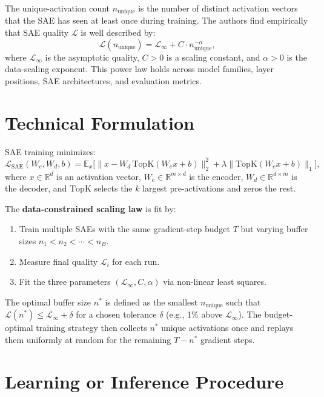 \documentclass[10pt,twocolumn]{article}
\begin{document}
The unique-activation count $n_\text{unique}$ is the number of distinct
activation vectors that the SAE has seen at least once during training. The
authors find empirically that SAE quality $\mathcal{L}$ is well described by:
\[
  \mathcal{L}(n_\text{unique}) = \mathcal{L}_\infty + C \cdot n_\text{unique}^{-\alpha},
\]
where $\mathcal{L}_\infty$ is the asymptotic quality, $C > 0$ is a scaling
constant, and $\alpha > 0$ is the data-scaling exponent. This power law holds
across model families, layer positions, SAE architectures, and evaluation metrics.

\section{Technical Formulation}

SAE training minimizes:
\[
  \mathcal{L}_\text{SAE}(W_e, W_d, b) =
    \mathbb{E}_x \bigl[ \|x - W_d\,\text{TopK}(W_e x + b)\|_2^2
    + \lambda \|\text{TopK}(W_e x + b)\|_1 \bigr],
\]
where $x \in \mathbb{R}^d$ is an activation vector, $W_e \in \mathbb{R}^{m\times d}$
is the encoder, $W_d \in \mathbb{R}^{d\times m}$ is the decoder, and
$\text{TopK}$ selects the $k$ largest pre-activations and zeros the rest.

The \textbf{data-constrained scaling law} is fit by:
\begin{enumerate}[itemsep=2pt,parsep=0pt]
  \item Train multiple SAEs with the same gradient-step budget $T$ but varying
    buffer sizes $n_1 < n_2 < \cdots < n_B$.
  \item Measure final quality $\mathcal{L}_i$ for each run.
  \item Fit the three parameters $(\mathcal{L}_\infty, C, \alpha)$ via
    non-linear least squares.
\end{enumerate}
The optimal buffer size $n^*$ is defined as the smallest $n_\text{unique}$ such
that $\mathcal{L}(n^*) \leq \mathcal{L}_\infty + \delta$ for a chosen tolerance
$\delta$ (e.g., 1\% above $\mathcal{L}_\infty$). The budget-optimal training
strategy then collects $n^*$ unique activations once and replays them uniformly
at random for the remaining $T - n^*$ gradient steps.

\section{Learning or Inference Procedure}
\end{document}
